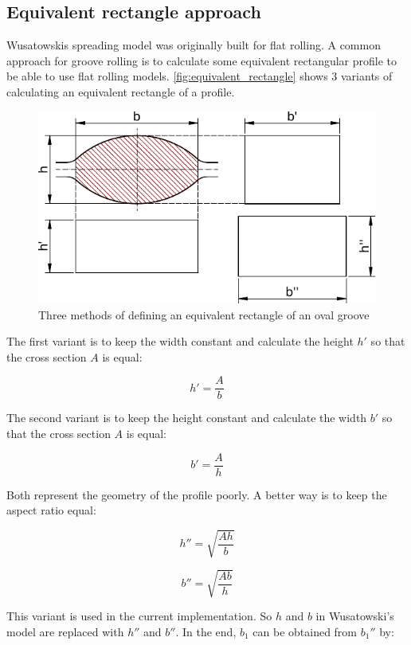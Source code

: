 \documentclass[11pt]{PyRollDocs}
\begin{document}
    \subsection{Equivalent rectangle approach}\label{subsec:equivalent-rectangle-approach}

    Wusatowskis spreading model was originally built for flat rolling.
    A common approach for groove rolling is to calculate some equivalent rectangular profile to be able to use flat rolling models.
    \autoref{fig:equivalent_rectangle} shows 3 variants of calculating an equivalent rectangle of a profile.

    \begin{figure}
        \centering
        \includegraphics[width=\linewidth]{equivalent_rectangle}
        \caption{Three methods of defining an equivalent rectangle of an oval groove}
        \label{fig:equivalent_rectangle}
    \end{figure}

    The first variant is to keep the width constant and calculate the height $h'$ so that the cross section $A$ is
    equal:

    \[
        h' = \frac{A}{b}
    \]

    The second variant is to keep the height constant and calculate the width $b'$ so that the cross section $A$ is
    equal:

    \[
        b' = \frac{A}{h}
    \]

    Both represent the geometry of the profile poorly.
    A better way is to keep the aspect ratio equal:

    \[
        h'' = \sqrt{\frac{A h}{b}}
    \]

    \[
        b'' = \sqrt{\frac{A b}{h}}
    \]

    This variant is used in the current implementation.
    So $h$ and $b$ in Wusatowski's model are replaced with $h''$ and $b''$.
    In the end, $b_1$ can be obtained from $b_1''$ by:
\end{document}
